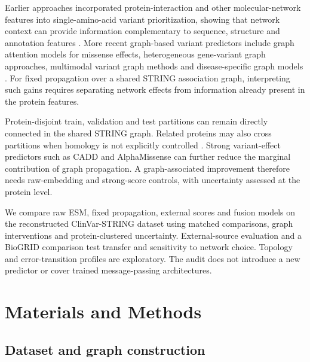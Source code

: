 \documentclass[conference]{IEEEtran}
\begin{document}
Earlier approaches incorporated protein-interaction and other molecular-network features into single-amino-acid variant prioritization, showing that network context can provide information complementary to sequence, structure and annotation features \cite{Yates2014SuSPect,Ozturk2022NetworkFeatures}. More recent graph-based variant predictors include graph attention models for missense effects, heterogeneous gene-variant graph approaches, multimodal variant graph methods and disease-specific graph models \cite{Zhang2022gMVP,Cheng2021VEGN,Yu2025GNNMAP,Ghadie2025DiseaseSpecificGNN}. For fixed propagation over a shared STRING association graph, interpreting such gains requires separating network effects from information already present in the protein features.

Protein-disjoint train, validation and test partitions can remain directly connected in the shared STRING graph. Related proteins may also cross partitions when homology is not explicitly controlled \cite{Littmann2022ProteinMLTips,Teufel2023GraphPart}. Strong variant-effect predictors such as CADD and AlphaMissense can further reduce the marginal contribution of graph propagation. A graph-associated improvement therefore needs raw-embedding and strong-score controls, with uncertainty assessed at the protein level.

We compare raw ESM, fixed propagation, external scores and fusion models on the reconstructed ClinVar-STRING dataset using matched comparisons, graph interventions and protein-clustered uncertainty. External-source evaluation and a BioGRID comparison test transfer and sensitivity to network choice. Topology and error-transition profiles are exploratory. The audit does not introduce a new predictor or cover trained message-passing architectures.

\section{Materials and Methods}

\subsection{Dataset and graph construction}
\end{document}
